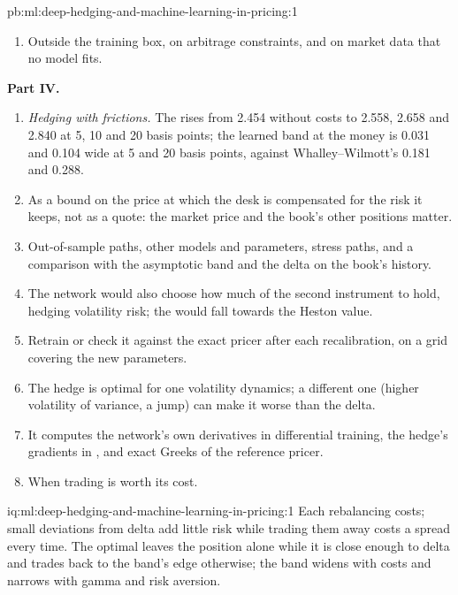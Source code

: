 \begin{solution}{pb:ml:deep-hedging-and-machine-learning-in-pricing:1}
\begin{enumerate}[resume]
\item Outside the training box, on arbitrage constraints, and on market data that no model fits.
\end{enumerate}
\textbf{Part IV.}
\begin{enumerate}[resume]
\item \emph{Hedging with frictions.} The  rises from 2.454 without costs to 2.558, 2.658 and 2.840 at 5, 10
and 20 basis points; the learned band at the money is 0.031 and 0.104 wide at 5 and 20 basis points, against Whalley--Wilmott's
0.181 and 0.288.
\item As a bound on the price at which the desk is compensated for the risk it keeps, not as a quote: the market price and
the book's other positions matter.
\item Out-of-sample paths, other models and parameters, stress paths, and a comparison with the asymptotic band and the delta
on the book's history.
\item The network would also choose how much of the second instrument to hold, hedging volatility risk; the  would fall towards the Heston value.
\item Retrain or check it against the exact pricer after each recalibration, on a grid covering the new parameters.
\item The hedge is optimal for one volatility dynamics; a different one (higher volatility of variance, a jump) can make it
worse than the delta.
\item It computes the network's own derivatives in differential training, the hedge's gradients in , and exact
Greeks of the reference pricer.
\item When trading is worth its cost.
\end{enumerate}
\end{solution}

\begin{solution}{iq:ml:deep-hedging-and-machine-learning-in-pricing:1}
Each rebalancing costs; small deviations from delta add little risk while trading them away costs a spread every time. The
optimal  leaves the position alone while it is close enough to delta and trades back to the band's edge otherwise; the
band widens with costs and narrows with gamma and risk aversion.
\end{solution}

